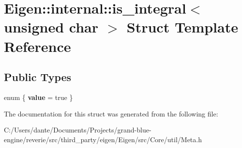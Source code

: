 \hypertarget{struct_eigen_1_1internal_1_1is__integral_3_01unsigned_01char_01_4}{}\section{Eigen\+::internal\+::is\+\_\+integral$<$ unsigned char $>$ Struct Template Reference}
\label{struct_eigen_1_1internal_1_1is__integral_3_01unsigned_01char_01_4}
\subsection*{Public Types}
\begin{DoxyCompactItemize}
\item 
\mbox{\label{struct_eigen_1_1internal_1_1is__integral_3_01unsigned_01char_01_4_a12e9f73a065d986811d1880b4dd2d825}} 
enum \{ {\bfseries value} = true
 \}
\end{DoxyCompactItemize}


The documentation for this struct was generated from the following file\+:\begin{DoxyCompactItemize}
\item 
C\+:/\+Users/dante/\+Documents/\+Projects/grand-\/blue-\/engine/reverie/src/third\+\_\+party/eigen/\+Eigen/src/\+Core/util/Meta.\+h\end{DoxyCompactItemize}
